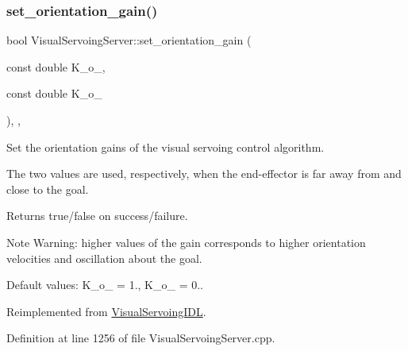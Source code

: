 \mbox{\label{classVisualServoingServer_a19bdb0b44a8b556bad599dc03fca5f3f}} 
\subsubsection{\texorpdfstring{set\+\_\+orientation\+\_\+gain()}{set\_orientation\_gain()}}
{\footnotesize\ttfamily bool Visual\+Servoing\+Server\+::set\+\_\+orientation\+\_\+gain (\begin{DoxyParamCaption}\item[{const double}]{K\+\_\+o\+\_,  }\item[{const double}]{K\+\_\+o\+\_ }\end{DoxyParamCaption})\hspace{0.3cm}{\ttfamily [override]}, {\ttfamily [protected]}, {\ttfamily [virtual]}}



Set the orientation gains of the visual servoing control algorithm. 

The two values are used, respectively, when the end-\/effector is far away from and close to the goal. \begin{DoxyReturn}{Returns}
true/false on success/failure. 
\end{DoxyReturn}
\begin{DoxyNote}{Note}
Warning\+: higher values of the gain corresponds to higher orientation velocities and oscillation about the goal. 

Default values\+: K\+\_\+o\+\_ = 1., K\+\_\+o\+\_ = 0.. 
\end{DoxyNote}


Reimplemented from \hyperlink{classVisualServoingIDL_a63069a57bf0a190f0d76b5c0eba694fb}{Visual\+Servoing\+I\+DL}.



Definition at line 1256 of file Visual\+Servoing\+Server.\+cpp.

\mbox{\label{classVisualServoingServer_a7d8c034f8a133f13ba9b4060ebcaf4bb}} 
